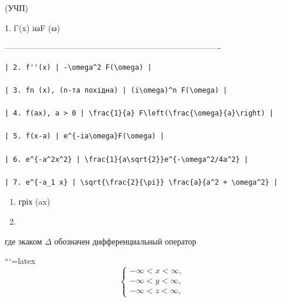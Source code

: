 \documentclass[
  ukrainian,
]{article}
\begin{document}
(УЧП)

1. f'(x) \textbar{} iωF (ω) \textbar{}

\textbar------------------------------\textbar-------------------------------------------------\textbar{}

\begin{verbatim}
| 2. f''(x) | -\omega^2 F(\omega) |

| 3. fn (x), (n-та похідна) | (i\omega)^n F(\omega) |

| 4. f(ax), a > 0 | \frac{1}{a} F\left(\frac{\omega}{a}\right) |

| 5. f(x-a) | e^{-ia\omega}F(\omega) |

| 6. e^{-a^2x^2} | \frac{1}{a\sqrt{2}}e^{-\omega^2/4a^2} |

| 7. e^{-a_1 x} | \sqrt{\frac{2}{\pi}} \frac{a}{a^2 + \omega^2} |
\end{verbatim}

\begin{enumerate}
\def\labelenumi{\arabic{enumi}.}
\setcounter{enumi}{19}
\item
  гріх (ax)
\item
\end{enumerate}

где экаком \(\Delta\) обозначен дифференциальный оператор

```{=latex}
\[
\begin{cases} -\infty < x < \infty, \\ -\infty < y < \infty, \\ -\infty < z < \infty, \end{cases}
\]
\end{document}
